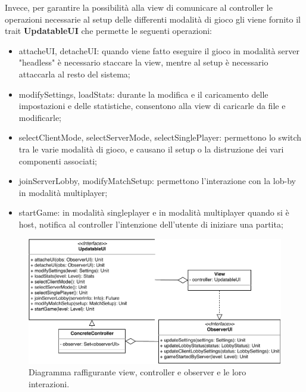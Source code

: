 Invece, per garantire la possibilità alla view di comunicare al controller le operazioni necessarie al setup delle differenti modalità di gioco gli viene fornito il trait \textbf{UpdatableUI} che permette le seguenti operazioni:
\begin{itemize}
    \item attacheUI, detacheUI: quando viene fatto eseguire il gioco in modalità server "headless" è necessario staccare la view, mentre al setup è necessario attaccarla al resto del sistema;
    \item modifySettings, loadStats: durante la modifica e il caricamento delle impostazioni e delle statistiche, consentono alla view di caricarle da file e modificarle;
    \item selectClientMode, selectServerMode, selectSinglePlayer: permettono lo switch tra le varie modalità di gioco, e causano il setup o la distruzione dei vari componenti associati;
    \item joinServerLobby, modifyMatchSetup: permettono l'interazione con la lob-by in modalità multiplayer;
    \item startGame: in modalità singleplayer e in modalità multiplayer quando si è host, notifica al controller l'intenzione dell'utente di iniziare una partita;
\end{itemize}




\begin{figure}[H]
	\centering
	\includegraphics[width=\columnwidth]{drawio/view-controller-observer/view-controller-observer.pdf}
	\caption{Diagramma raffigurante view, controller e observer e le loro interazioni.}
	\label{fig:view-controller-observer}
\end{figure}